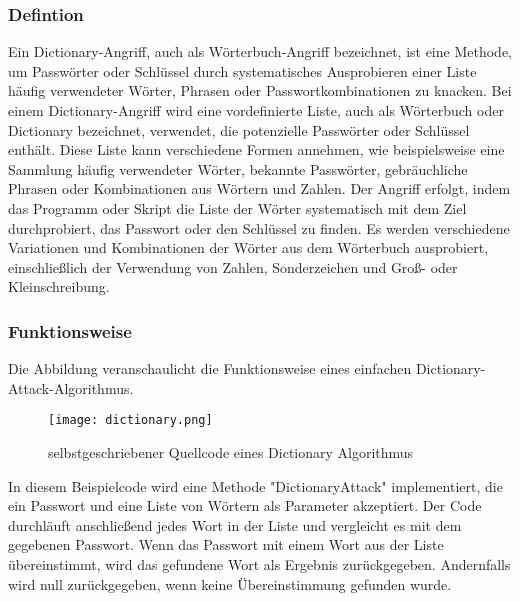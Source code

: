 \subsubsection{Defintion}
Ein Dictionary-Angriff, auch als Wörterbuch-Angriff bezeichnet, ist eine Methode, um Passwörter oder Schlüssel durch systematisches Ausprobieren einer Liste häufig verwendeter Wörter, Phrasen oder Passwortkombinationen zu knacken.
Bei einem Dictionary-Angriff wird eine vordefinierte Liste, auch als Wörterbuch oder Dictionary bezeichnet, verwendet, die potenzielle Passwörter oder Schlüssel enthält. 
Diese Liste kann verschiedene Formen annehmen, wie beispielsweise eine Sammlung häufig verwendeter Wörter, bekannte Passwörter, gebräuchliche Phrasen oder Kombinationen aus Wörtern und Zahlen.
Der Angriff erfolgt, indem das Programm oder Skript die Liste der Wörter systematisch mit dem Ziel durchprobiert, das Passwort oder den Schlüssel zu finden. 
Es werden verschiedene Variationen und Kombinationen der Wörter aus dem Wörterbuch ausprobiert, einschließlich der Verwendung von Zahlen, Sonderzeichen und Groß- oder Kleinschreibung.
\subsubsection{Funktionsweise}
Die Abbildung veranschaulicht die Funktionsweise eines einfachen Dictionary-Attack-Algorithmus.
\begin{figure}[H]
    \centering
      \texttt{[image: dictionary.png]}
     \caption[Quellcode eines Dictionary Algorithmus]{selbstgeschriebener Quellcode eines Dictionary Algorithmus\protect\footnotemark}
     \label{Quellcode eines Dictionary Algorithmus}
  \end{figure}
  In diesem Beispielcode wird eine Methode "DictionaryAttack" implementiert, die ein Passwort und eine Liste von Wörtern als Parameter akzeptiert. 
  Der Code durchläuft anschließend jedes Wort in der Liste und vergleicht es mit dem gegebenen Passwort.
  Wenn das Passwort mit einem Wort aus der Liste übereinstimmt, wird das gefundene Wort als Ergebnis zurückgegeben. 
  Andernfalls wird null zurückgegeben, wenn keine Übereinstimmung gefunden wurde.
